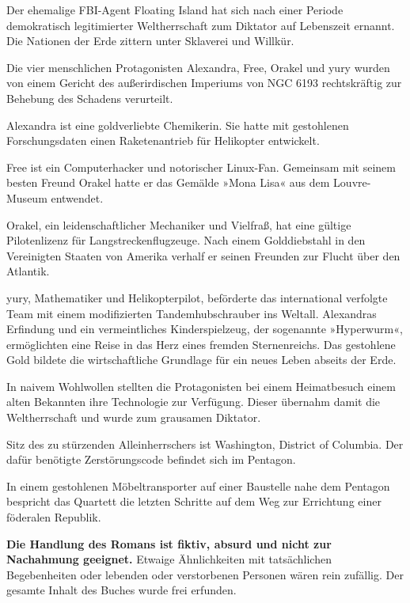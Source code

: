 
Der ehemalige FBI-Agent Floating Island hat sich nach einer Periode demokratisch legitimierter Weltherrschaft zum Diktator auf Lebenszeit ernannt. Die Nationen der Erde zittern unter Sklaverei und Willkür.

\bigskip

\noindent Die vier menschlichen Protagonisten Alexandra, Free, Orakel und yury wurden von einem Gericht des außerirdischen Imperiums von NGC 6193 rechtskräftig zur Behebung des Schadens verurteilt.

Alexandra ist eine goldverliebte Chemikerin. Sie hatte mit gestohlenen Forschungsdaten einen Raketenantrieb für Helikopter entwickelt.

Free ist ein Computerhacker und notorischer Linux-Fan. Gemeinsam mit seinem besten Freund Orakel hatte er das Gemälde »Mona Lisa« aus dem Louvre-Museum entwendet.

Orakel, ein leidenschaftlicher Mechaniker und Vielfraß, hat eine gültige Pilotenlizenz für Langstreckenflugzeuge. Nach einem Golddiebstahl in den Vereinigten Staaten von Amerika verhalf er seinen Freunden zur Flucht über den Atlantik.

yury, Mathematiker und Helikopterpilot, beförderte das international verfolgte Team mit einem modifizierten Tandemhubschrauber ins Weltall. Alexandras Erfindung und ein vermeintliches Kinderspielzeug, der sogenannte »Hyperwurm«, ermöglichten eine Reise in das Herz eines fremden Sternenreichs. Das gestohlene Gold bildete die wirtschaftliche Grundlage für ein neues Leben abseits der Erde.

\bigskip

\noindent In naivem Wohlwollen stellten die Protagonisten bei einem Heimatbesuch einem alten Bekannten ihre Technologie zur Verfügung. Dieser übernahm damit die Weltherrschaft und wurde zum grausamen Diktator.

Sitz des zu stürzenden Alleinherrschers ist Washington, District of Columbia. Der dafür benötigte Zerstörungscode befindet sich im Pentagon.

In einem gestohlenen Möbeltransporter auf einer Baustelle nahe dem Pentagon bespricht das Quartett die letzten Schritte auf dem Weg zur Errichtung einer föderalen Republik.

\bigskip

\noindent \textbf{Die Handlung des Romans ist fiktiv, absurd und nicht zur Nachahmung geeignet.} Etwaige Ähnlichkeiten mit tatsächlichen Begebenheiten oder lebenden oder verstorbenen Personen wären rein zufällig. Der gesamte Inhalt des Buches wurde frei erfunden.

